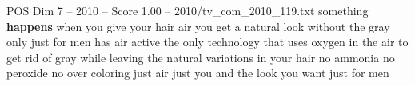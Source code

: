 \begin{textsample}{POS Dim 7 – 2010 – Score 1.00 – 2010/tv\_com\_2010\_119.txt}  \label{ex:f7_pos_079}
something \textbf{happens} when you give your hair air you get a natural look without the gray only just for men has air active the only technology that uses oxygen in the air to get rid of gray while leaving the natural variations in your hair no ammonia no peroxide no over coloring just air just you and the look you want just for men

\end{textsample}
